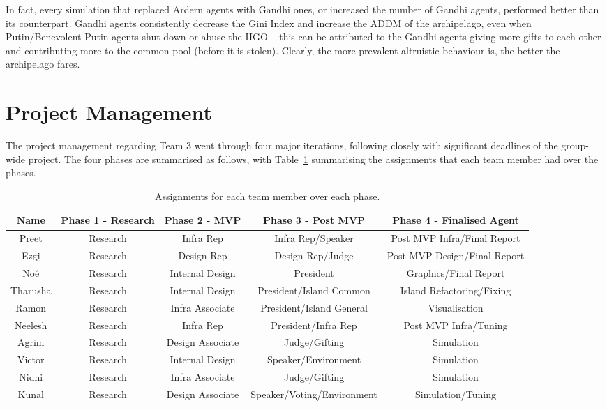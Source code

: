In fact, every simulation that replaced Ardern agents with Gandhi ones, or increased the number of Gandhi agents, performed better than its counterpart. Gandhi agents consistently decrease the Gini Index and increase the ADDM of the archipelago, even when Putin/Benevolent Putin agents shut down or abuse the IIGO -- this can be attributed to the Gandhi agents giving more gifts to each other and contributing more to the common pool (before it is stolen). Clearly, the more prevalent altruistic behaviour is, the better the archipelago fares. 


\section{Project Management}
\label{sec:management}

The project management regarding Team 3 went through four major iterations, following closely with significant deadlines of the group-wide project. The four phases are summarised as follows, with Table~\ref{tab:phase_jobs} summarising the assignments that each team member had over the phases.

\begin {table} [h]
\begin{center}
\begin{adjustbox}{max width=1.1\textwidth,center}
\begin{tabular}{|c||c c c c|}
    \hline
    Name & Phase 1 - Research & Phase 2 - MVP & Phase 3 - Post MVP & Phase 4 - Finalised Agent\\ \hline \hline
    Preet & Research & Infra Rep & Infra Rep/Speaker & Post MVP Infra/Final Report \\ \hline
    Ezgi & Research & Design Rep & Design Rep/Judge & Post MVP Design/Final Report \\ \hline
    Noé & Research & Internal Design & President & Graphics/Final Report \\ \hline
    Tharusha & Research & Internal Design & President/Island Common & Island Refactoring/Fixing \\ \hline
    Ramon & Research & Infra Associate & President/Island General & Visualisation  \\ \hline
    Neelesh & Research & Infra Rep & President/Infra Rep & Post MVP Infra/Tuning \\ \hline
    Agrim & Research & Design Associate & Judge/Gifting & Simulation \\ \hline
    Victor & Research & Internal Design & Speaker/Environment & Simulation \\ \hline
    Nidhi & Research & Infra Associate & Judge/Gifting & Simulation \\ \hline
    Kunal & Research & Design Associate & Speaker/Voting/Environment & Simulation/Tuning \\ 
    \hline
\end{tabular}
\end{adjustbox}
\end{center}
\label{tab:phase_jobs}
\caption{Assignments for each team member over each phase.}
\end{table}

